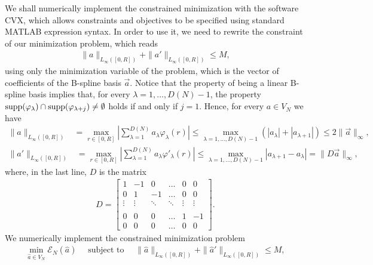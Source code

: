 We shall numerically implement the constrained minimization with the software CVX, which allows constraints and objectives to be specified using standard MATLAB expression syntax. In order to use it, we need to rewrite the constraint of our minimization problem, which reads
\begin{align*}
	\|a\|_{L_{\infty}([0,R])} + \|a'\|_{L_{\infty}([0,R])} \leq M,
\end{align*}
using only the minimization variable of the problem, which is the vector of coefficients of the B-spline basis $\vec{a}$. Notice that the property of being a linear B-spline basis implies that, for every $\lambda = 1, \ldots, D(N)-1$, the property $\operatorname{supp}(\varphi_{\lambda}) \cap \operatorname{supp}(\varphi_{\lambda + j}) \not= \emptyset$ holds if and only if $j = 1$. Hence, for every $a \in V_N$ we have
\begin{align*}
\|a\|_{L_{\infty}([0,R])} &= \max_{r \in [0,R]} \left|\sum^{D(N)}_{\lambda = 1} a_{\lambda} \varphi_{\lambda}(r)\right|
 \leq \max_{\lambda = 1, \ldots, D(N)-1} \left(|a_{\lambda}| + |a_{\lambda+1}|\right) 
 \leq 2 \|\vec{a}\|_{\infty},
\end{align*}
\begin{align*}
\|a'\|_{L_{\infty}([0,R])} &= \max_{r \in [0,R]} \left|\sum^{D(N)}_{\lambda = 1} a_{\lambda} \varphi'_{\lambda}(r)\right| 
 \leq \max_{\lambda = 1, \ldots, D(N)-1} |a_{\lambda+1} - a_{\lambda}|
 = \|D\vec{a}\|_{\infty},
\end{align*}
where, in the last line, $D$ is the matrix
\begin{align*}
D = \begin{bmatrix}
    1       & -1 & 0 & \dots & 0 & 0 \\
    0     & 1 & -1 & \dots & 0 & 0 \\
   \vdots & \vdots & \ddots & \ddots & \vdots & \vdots \\ \\
    0       & 0 & 0 & \dots & 1 & -1 \\
    0       & 0 & 0 & \dots & 0 & 0
\end{bmatrix}.
\end{align*}
We numerically implement the constrained minimization problem
\begin{align*}
\min_{\widehat{a} \in V_N} \mathcal{E}_N(\widehat{a}) \quad \text{ subject to } \quad \|\widehat{a}\|_{L_{\infty}([0,R])} + \|\widehat{a}'\|_{L_{\infty}([0,R])} \leq M,
\end{align*}
